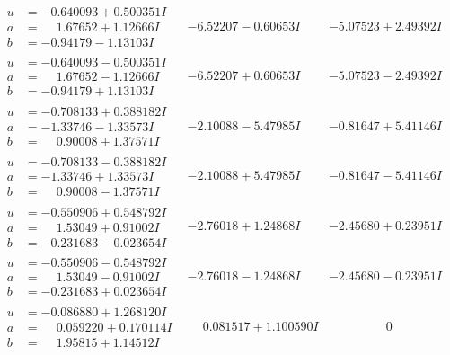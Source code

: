 \documentclass[1p]{elsarticle_modified}
\theoremstyle{definition}
\begin{document}
$$\begin{array}{c|c|c}
\begin{aligned}
u &= -0.640093 + 0.500351 I \\
a &= \phantom{-}1.67652 + 1.12666 I \\
b &= -0.94179 - 1.13103 I\end{aligned}
 & -6.52207 - 0.60653 I & -5.07523 + 2.49392 I \\ \hline\begin{aligned}
u &= -0.640093 - 0.500351 I \\
a &= \phantom{-}1.67652 - 1.12666 I \\
b &= -0.94179 + 1.13103 I\end{aligned}
 & -6.52207 + 0.60653 I & -5.07523 - 2.49392 I \\ \hline\begin{aligned}
u &= -0.708133 + 0.388182 I \\
a &= -1.33746 - 1.33573 I \\
b &= \phantom{-}0.90008 + 1.37571 I\end{aligned}
 & -2.10088 - 5.47985 I & -0.81647 + 5.41146 I \\ \hline\begin{aligned}
u &= -0.708133 - 0.388182 I \\
a &= -1.33746 + 1.33573 I \\
b &= \phantom{-}0.90008 - 1.37571 I\end{aligned}
 & -2.10088 + 5.47985 I & -0.81647 - 5.41146 I \\ \hline\begin{aligned}
u &= -0.550906 + 0.548792 I \\
a &= \phantom{-}1.53049 + 0.91002 I \\
b &= -0.231683 - 0.023654 I\end{aligned}
 & -2.76018 + 1.24868 I & -2.45680 + 0.23951 I \\ \hline\begin{aligned}
u &= -0.550906 - 0.548792 I \\
a &= \phantom{-}1.53049 - 0.91002 I \\
b &= -0.231683 + 0.023654 I\end{aligned}
 & -2.76018 - 1.24868 I & -2.45680 - 0.23951 I \\ \hline\begin{aligned}
u &= -0.086880 + 1.268120 I \\
a &= \phantom{-}0.059220 + 0.170114 I \\
b &= \phantom{-}1.95815 + 1.14512 I\end{aligned}
 & \phantom{-}0.081517 + 1.100590 I & \phantom{-0.000000 } 0 \\ \hline\begin{aligned}

\end{aligned}
\end{array}$$
\end{document}
